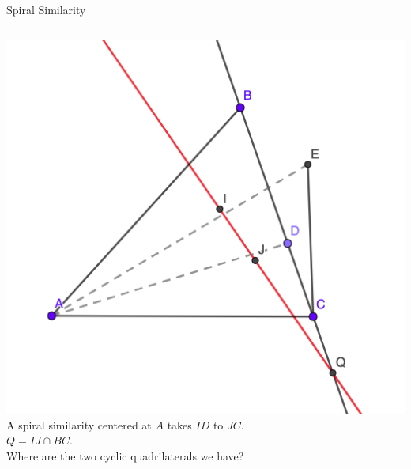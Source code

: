 \documentclass{beamer}
\begin{document}
\begin{frame}{Spiral Similarity}
	\begin{columns}
		\includegraphics[scale=0.34]{spi10.png}
		A spiral similarity centered at $A$ takes $ID$ to $JC$.\\
		$Q = IJ\cap BC$.\\
		\phantom{Spacing}
		Where are the two cyclic quadrilaterals we have?
	\end{columns}
\end{frame}
\end{document}
